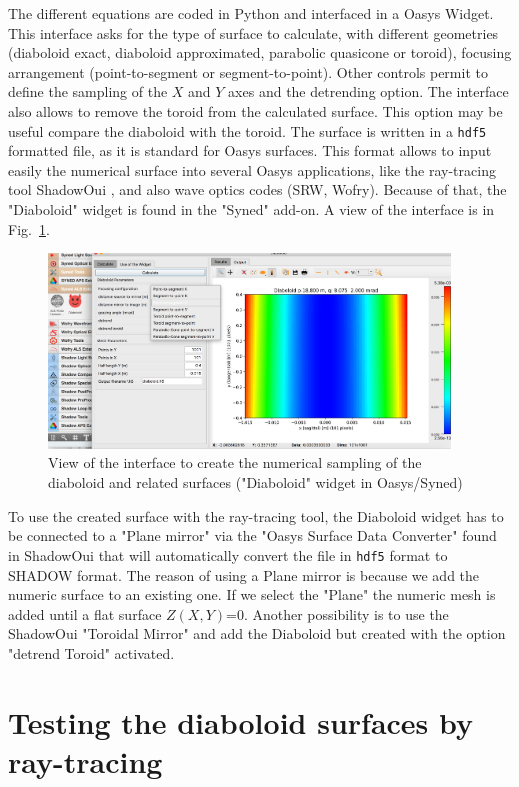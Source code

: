 \documentclass{iucr}              %
\begin{document}
The different equations are coded in Python and interfaced in a Oasys Widget. This interface asks for the type of surface to calculate, with different geometries (diaboloid exact, diaboloid approximated, parabolic quasicone or toroid), focusing arrangement (point-to-segment or segment-to-point). Other controls permit to define the sampling of the $X$ and $Y$ axes and the detrending option. The interface also allows to remove the toroid from the calculated surface. This option may be useful compare the diaboloid with the toroid. The surface is written in a {\tt hdf5} formatted file, as it is standard for Oasys surfaces. This format allows to input easily the numerical surface into several Oasys applications, like the ray-tracing tool ShadowOui \cite{codeSHADOWOUI}, and also wave optics codes (SRW, Wofry). Because of that, the "Diaboloid" widget is found in the "Syned" add-on. A view of the interface is in Fig.~\ref{fig:widget}.

\begin{figure}\label{fig:widget}
\centering
\includegraphics[width=0.95\textwidth]{figures/widget.png}
\caption{View of the interface to create the numerical sampling of the diaboloid and related surfaces ("Diaboloid" widget in Oasys/Syned) }
\end{figure}

To use the created surface with the ray-tracing tool, the Diaboloid widget has to be connected to a "Plane mirror" via the "Oasys Surface Data Converter" found in ShadowOui that will automatically convert the file in {\tt hdf5} format to SHADOW format. The reason of using a Plane mirror is because we add the numeric surface to an existing one. If we select the "Plane" the numeric mesh is added until a flat surface $Z(X,Y)$=0. Another possibility is to use the ShadowOui "Toroidal Mirror" and add the Diaboloid but created with the option "detrend Toroid" activated.  

\section{Testing the diaboloid surfaces by ray-tracing}
\label{sec:testing}
\end{document}

